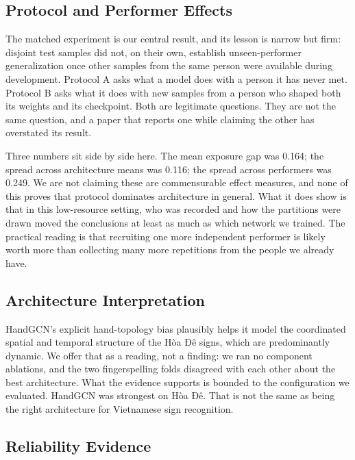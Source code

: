 \subsection{Protocol and Performer Effects}

The matched experiment is our central result, and its lesson is narrow but firm: disjoint test samples did not, on their own, establish unseen-performer generalization once other samples from the same person were available during development. Protocol A asks what a model does with a person it has never met. Protocol B asks what it does with new samples from a person who shaped both its weights and its checkpoint. Both are legitimate questions. They are not the same question, and a paper that reports one while claiming the other has overstated its result.

Three numbers sit side by side here. The mean exposure gap was 0.164; the spread across architecture means was 0.116; the spread across performers was 0.249. We are not claiming these are commensurable effect measures, and none of this proves that protocol dominates architecture in general. What it does show is that in this low-resource setting, who was recorded and how the partitions were drawn moved the conclusions at least as much as which network we trained. The practical reading is that recruiting one more independent performer is likely worth more than collecting many more repetitions from the people we already have.

\subsection{Architecture Interpretation}

HandGCN's explicit hand-topology bias plausibly helps it model the coordinated spatial and temporal structure of the Hòa Đê signs, which are predominantly dynamic. We offer that as a reading, not a finding: we ran no component ablations, and the two fingerspelling folds disagreed with each other about the best architecture. What the evidence supports is bounded to the configuration we evaluated. HandGCN was strongest on Hòa Đê. That is not the same as being the right architecture for Vietnamese sign recognition.

\subsection{Reliability Evidence}

